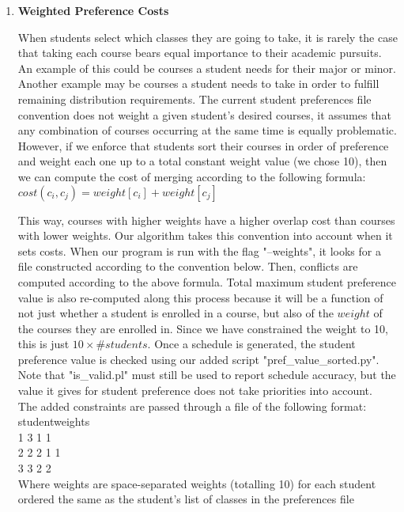 \documentclass[11pt, oneside]{article}   	%
\begin{document}
\begin{enumerate}
\item{\textbf{Weighted Preference Costs}}

When students select which classes they are going to take, it is rarely the case that taking each course bears equal importance to their academic pursuits. An example of this could be courses a student needs for their major or minor. Another example may be courses a student needs to take in order to fulfill remaining distribution requirements. The current student preferences file convention does not weight a given student's desired courses, it assumes that any combination of courses occurring at the same time is equally problematic. However, if we enforce that students sort their courses in order of preference and weight each one up to a total constant weight value (we chose 10), then we can compute the cost of merging according to the following formula:\\

$cost(c_i,c_j) = weight[c_i] + weight[c_j]$

This way, courses with higher weights have a higher overlap cost than courses with lower weights. Our algorithm takes this convention into account when it sets costs. When our program is run with the flag "--weights", it looks for a file constructed according to the convention below. Then, conflicts are computed according to the above formula. Total maximum student preference value is also re-computed along this process because it will be a function of not just whether a student is enrolled in a course, but also of the $weight$ of the courses they are enrolled in. Since we have constrained the weight to 10, this is just $10\times \#students$. Once a schedule is generated, the student preference value is checked using our added script "pref\_value\_sorted.py". Note that "is\_valid.pl" must still be used to report schedule accuracy, but the value it gives for student preference does not take priorities into account.\\

The added constraints are passed through a file of the following format:\\

student\qquad weights \\
1 3 1 1 \\
2 2 2 1 1 \\
3 3 2 2  \\

Where weights are space-separated weights (totalling 10) for each student ordered the same as the student's list of classes in the preferences file


\end{enumerate}
\end{document}
